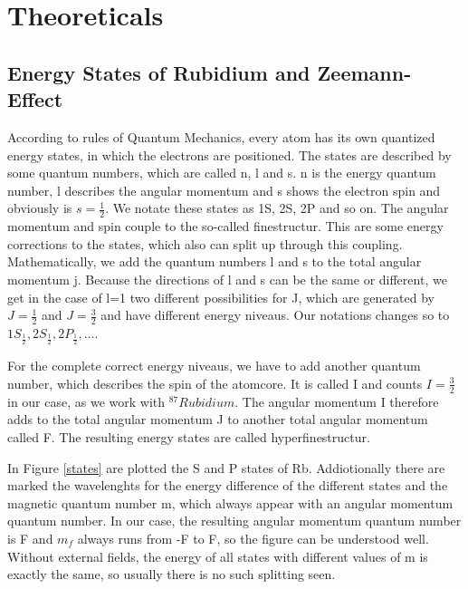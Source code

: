 \section{Theoreticals}
\subsection{Energy States of Rubidium and Zeemann-Effect}

According to rules of Quantum Mechanics, every atom has its own quantized energy states, in which the electrons are positioned. The states are described by some quantum numbers, which are called n, l and s. n is the energy quantum number, l describes the angular momentum and s shows the electron spin and obviously is $s=\frac{1}{2}$. We notate these states as 1S, 2S, 2P and so on.
The angular momentum and spin couple to the so-called finestructur. This are some energy corrections to the states, which also can split up through this coupling. Mathematically, we add the quantum numbers l and s to the total angular momentum j. Because the directions of l and s can be the same or different, we get in the case of l=1 two different possibilities for J, which are generated by $J=\frac{1}{2}$ and $J=\frac{3}{2}$ and have different energy niveaus. Our notations changes so to $1S_{\frac{1}{2}}, 2S_{\frac{1}{2}}, 2P_{\frac{1}{2}}, ...$.

For the complete correct energy niveaus, we have to add another quantum number, which describes the spin of the atomcore. It is called I and counts $I=\frac{3}{2}$ in our case, as we work with $^{87}Rubidium$. The angular momentum I therefore adds to the total angular momentum J to another total angular momentum called F. The resulting energy states are called hyperfinestructur.

In Figure \ref{states} are plotted the S and P states of Rb. Addiotionally there are marked the wavelenghts  for the energy difference of the different states and the magnetic quantum number m, which always appear with an angular momentum quantum number. In our case, the resulting angular momentum quantum number is F and $m_f$ always runs from -F to F, so the figure can be understood well. Without external fields, the energy of all states with different values of m is exactly the same, so usually there is no such splitting seen.

